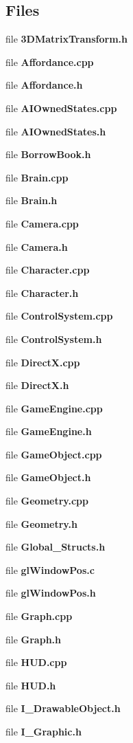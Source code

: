 \subsection*{Files}
\begin{DoxyCompactItemize}
\item 
file {\bf 3\+D\+Matrix\+Transform.\+h}
\item 
file {\bf Affordance.\+cpp}
\item 
file {\bf Affordance.\+h}
\item 
file {\bf A\+I\+Owned\+States.\+cpp}
\item 
file {\bf A\+I\+Owned\+States.\+h}
\item 
file {\bf Borrow\+Book.\+h}
\item 
file {\bf Brain.\+cpp}
\item 
file {\bf Brain.\+h}
\item 
file {\bf Camera.\+cpp}
\item 
file {\bf Camera.\+h}
\item 
file {\bf Character.\+cpp}
\item 
file {\bf Character.\+h}
\item 
file {\bf Control\+System.\+cpp}
\item 
file {\bf Control\+System.\+h}
\item 
file {\bf Direct\+X.\+cpp}
\item 
file {\bf Direct\+X.\+h}
\item 
file {\bf Game\+Engine.\+cpp}
\item 
file {\bf Game\+Engine.\+h}
\item 
file {\bf Game\+Object.\+cpp}
\item 
file {\bf Game\+Object.\+h}
\item 
file {\bf Geometry.\+cpp}
\item 
file {\bf Geometry.\+h}
\item 
file {\bf Global\+\_\+\+Structs.\+h}
\item 
file {\bf gl\+Window\+Pos.\+c}
\item 
file {\bf gl\+Window\+Pos.\+h}
\item 
file {\bf Graph.\+cpp}
\item 
file {\bf Graph.\+h}
\item 
file {\bf H\+U\+D.\+cpp}
\item 
file {\bf H\+U\+D.\+h}
\item 
file {\bf I\+\_\+\+Drawable\+Object.\+h}
\item 
file {\bf I\+\_\+\+Graphic.\+h}
\item 

\end{DoxyCompactItemize}
